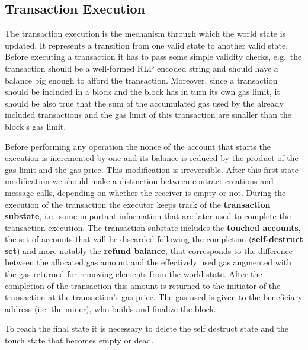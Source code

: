 \subsection{Transaction Execution}
The transaction execution is the mechanism through which the world state is
updated. It represents a transition from one
valid state to another valid state. Before executing a transaction it
has to pass some simple validity checks, e.g.\ the transaction should be a
well-formed RLP encoded string and should have a balance big enough to afford
the transaction.
Moreover, since a transaction should be included in a block and the block
has in turn its own gas limit, it should be also true that the sum 
of the accumulated gas used by the already included transactions and the gas
limit of this transaction are smaller than the block's gas limit.

Before performing any operation the nonce of the 
account that starts the execution is incremented by one and its balance is
reduced by the product of the gas limit and the gas price. This modification
is irreversible.
After this first state modification we should  make a distinction between
contract creations and message calls, depending on whether the receiver is
empty or not.
During the execution of the transaction the executor keeps track of the
\textbf{transaction substate}, i.e.\ some important information that
are later used to complete the transaction execution.
The transaction substate includes the \textbf{touched accounts}, the set of
accounts that will be discarded following the completion (\textbf{self-destruct
set}) and more notably the
\textbf{refund balance}, that corresponds
to the difference between the allocated gas amount and the effectively used
gas augmented with the gas returned for removing elements from the world
state. After the completion of the transaction this amount is returned to the
initiator of the transaction at the transaction's gas price.
The gas used is given to the beneficiary address (i.e. the miner), who builds 
and finalize the block.

To reach the final state it is necessary to delete the self destruct state and
the touch state that becomes empty or dead.
